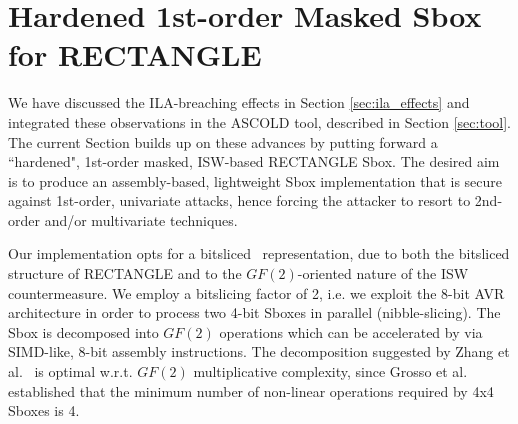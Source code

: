 \section{Hardened 1st-order Masked Sbox for RECTANGLE}\label{sec:rectangle}
We have discussed the ILA-breaching effects in Section \ref{sec:ila_effects} and integrated these observations in the ASCOLD tool,  described in Section \ref{sec:tool}. The current Section builds up on these advances by putting forward a ``hardened", 1st-order masked, ISW-based RECTANGLE Sbox. The desired aim is to produce an assembly-based, lightweight Sbox implementation that is secure against 1st-order, univariate attacks, hence forcing the attacker to resort to 2nd-order and/or multivariate techniques. 

Our implementation opts for a bitsliced~\cite{DBLP:conf/fse/Biham97a} representation, due to both the bitsliced structure of RECTANGLE and to the $GF(2)$-oriented nature of the ISW countermeasure. We employ a bitslicing factor of 2, i.e. we exploit the 8-bit AVR architecture in order to process two 4-bit Sboxes in parallel (nibble-slicing). The Sbox is decomposed into $GF(2)$ operations which can be accelerated by via SIMD-like, 8-bit assembly instructions. The decomposition suggested by Zhang et al.~\cite{DBLP:journals/chinaf/ZhangBLR0V15} is optimal w.r.t. $GF(2)$ multiplicative complexity, since Grosso et al.~\cite{DBLP:conf/fse/GrossoLSV14} established that the minimum number of non-linear operations required by 4x4 Sboxes is 4. 

